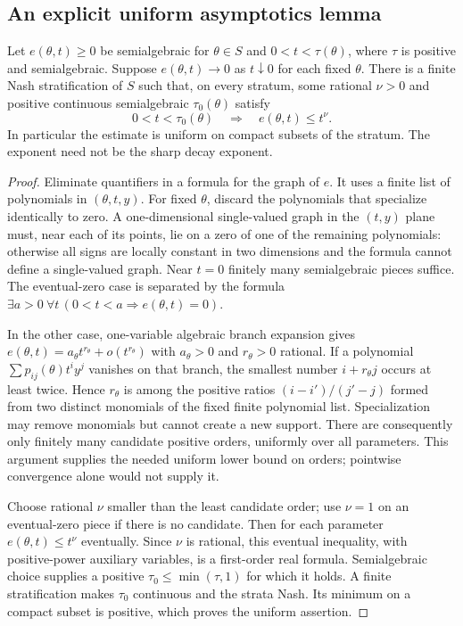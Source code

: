 \subsection{An explicit uniform asymptotics lemma}
\begin{proposition}\label{prop:decay}
Let $e(\theta,t)\ge0$ be semialgebraic for
$\theta\in S$ and $0<t<\tau(\theta)$, where $\tau$ is positive and
semialgebraic. Suppose $e(\theta,t)\to0$ as $t\downarrow0$ for each
fixed $\theta$. There is a finite Nash stratification of $S$ such that,
on every stratum, some rational $\nu>0$ and positive continuous
semialgebraic $\tau_0(\theta)$ satisfy
\[
 0<t<\tau_0(\theta)\quad\Longrightarrow\quad e(\theta,t)\le t^\nu.
\]
In particular the estimate is uniform on compact subsets of the stratum.
The exponent need not be the sharp decay exponent.
\end{proposition}
\begin{proof}
Eliminate quantifiers in a formula for the graph of $e$. It uses a finite
list of polynomials in $(\theta,t,y)$. For fixed $\theta$, discard the
polynomials that specialize identically to zero. A one-dimensional
single-valued graph in the $(t,y)$ plane must, near each of its points,
lie on a zero of one of the remaining polynomials: otherwise all signs
are locally constant in two dimensions and the formula cannot define a
single-valued graph. Near $t=0$ finitely many semialgebraic pieces suffice.
The eventual-zero case is separated by the formula
$\exists a>0\ \forall t\,(0<t<a\Rightarrow e(\theta,t)=0)$.

In the other case, one-variable algebraic branch expansion gives
$e(\theta,t)=a_\theta t^{r_\theta}+o(t^{r_\theta})$ with
$a_\theta>0$ and $r_\theta>0$ rational. If a polynomial
$\sum p_{ij}(\theta)t^iy^j$ vanishes on that branch, the smallest
number $i+r_\theta j$ occurs at least twice. Hence $r_\theta$ is among
the positive ratios $(i-i')/(j'-j)$ formed from two distinct monomials
of the fixed finite polynomial list. Specialization may remove monomials
but cannot create a new support. There are consequently only finitely
many candidate positive orders, uniformly over all parameters. This
argument supplies the needed uniform lower bound on orders; pointwise
convergence alone would not supply it.

Choose rational $\nu$ smaller than the least candidate order; use
$\nu=1$ on an eventual-zero piece if there is no candidate. Then for
each parameter $e(\theta,t)\le t^\nu$ eventually. Since $\nu$ is rational,
this eventual inequality, with positive-power auxiliary variables, is a
first-order real formula. Semialgebraic choice supplies a positive
$\tau_0\le\min(\tau,1)$ for which it holds. A finite stratification
makes $\tau_0$ continuous and the strata Nash. Its minimum on a compact
subset is positive, which proves the uniform assertion.
\end{proof}

